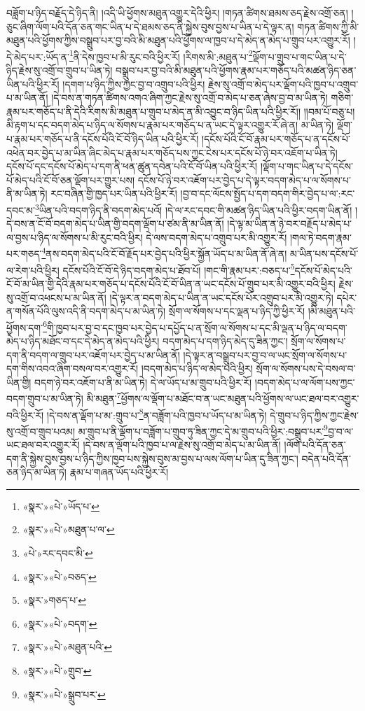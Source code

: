 བཟློག་པ་ཉིད་བརྗོད་དེ་ཉིད་ནི། །འདི་ཡི་ཕྱོགས་མཐུན་འགྱུར་དེའི་ཕྱིར། །གཏན་ཚིགས་ཐམས་ཅད་རྗེས་འགྲོ་ཅན། །ཅུང་ཞིག་ལོག་པའི་དོན་ཅན་གང་ཡིན་པ་དེ་ཐམས་ཅད་ནི་སྐྱེས་བུས་བྱས་པ་ཡིན་པ་དེ་ལྟར་ན། གཏན་ཚིགས་ཀྱི་མི་མཐུན་པའི་ཕྱོགས་ཀྱིས་བསྒྲུབ་པར་བྱ་བའི་མི་མཐུན་པའི་ཕྱོགས་ལ་ཁྱབ་པ་དེ་མེད་ན་མེད་པ་གྲུབ་པར་འགྱུར་རོ། །དེ་མེད་པར་:ཡོད་ན་\footnote{«སྣར་»«པེ་»ཡོད་པ་}ནི་དེས་ཁྱབ་པ་མི་རུང་བའི་ཕྱིར་རོ། །རིགས་མི་:མཐུན་པ་\footnote{«སྣར་»«པེ་»མཐུན་པ་ལ་}ལྡོག་པ་གྲུབ་པ་གང་ཡིན་པ་དེ་ཉིད་རྗེས་སུ་འགྲོ་བ་གྲུབ་པ་ཡིན་ཏེ། བསྒྲུབ་པར་བྱ་བའི་མི་མཐུན་པའི་ཕྱོགས་རྣམ་པར་གཅོད་པའི་མཚན་ཉིད་ཅན་ཡིན་པའི་ཕྱིར་རོ། །དགག་པ་ཉིད་ཀྱིས་ཀྱང་བྱ་བ་འགྲུབ་པའི་ཕྱིར། རྗེས་སུ་འགྲོ་བ་མེད་པར་ལྡོག་པའི་ཁྱབ་པ་འགྲུབ་པ་མ་ཡིན་ནོ། །དེ་བས་ན་གཏན་ཚིགས་འགའ་ཞིག་ཀྱང་རྗེས་སུ་འགྲོ་བ་མེད་པ་ཅན་ཞེས་བྱ་བ་མ་ཡིན་ཏེ། གཅིག་རྣམ་པར་གཅོད་པ་ནི་དེའི་རིགས་མི་མཐུན་པ་གྲུབ་པ་མེད་ན་མི་འབྱུང་བ་ཉིད་ཡིན་པའི་ཕྱིར་རོ།། །།བམ་པོ་བཅུ་པ། མི་རྟག་པ་དང་བདག་མེད་པ་ཉིད་ལ་སོགས་པ་རྣམ་པར་གཅོད་པ་ན་ཡང་དེ་ལྟར་འགྱུར་རོ་ཞེ་ན། མ་ཡིན་ཏེ། ལྡོག་པ་རྣམ་པར་གཅོད་པ་ནི་དངོས་པོའི་ངོ་བོ་ཉིད་ཡིན་པའི་ཕྱིར་རོ། །དངོས་པོའི་ངོ་བོ་རྣམ་པར་གཅོད་པ་ན་དངོས་པོ་འཕེན་བར་བྱེད་པ་མ་ཡིན་ཞིང་མེད་པ་རྣམ་པར་གཅོད་པས་ཀྱང་ངེས་པར་དངོས་པོ་ཉེ་བར་འཇོག་པ་ཡིན་ཏེ། དངོས་པོ་དང་དངོས་པོ་མེད་པ་དག་ནི་ཕན་ཚུན་དབེན་པའི་ངོ་བོ་ཡིན་པའི་ཕྱིར་རོ། །ལྡོག་པ་གང་ཡིན་པ་དེ་དངོས་པོ་མེད་པའི་ངོ་བོ་ཅན་ལྡོག་པར་གྱུར་པས། དངོས་པོ་ཉེ་བར་འཇོག་པར་བྱེད་པ་དེ་ལྟར་བདག་མེད་པ་ལ་སོགས་པ་ནི་མ་ཡིན་ཏེ། རང་བཞིན་གྱི་ཁྱད་པར་ཡིན་པའི་ཕྱིར་རོ། །བྱ་བ་དང་ལོངས་སྤྱོད་པ་དག་བདག་གིར་བྱེད་པ་ལ་:རང་དབང་མ་\footnote{«པེ་»རང་དབང་མི་}ཡིན་པའི་བདག་ཉིད་ནི་བདག་མེད་པའོ། །དེ་ལ་རང་དབང་གི་མཚན་ཉིད་ཡིན་པའི་ཕྱིར་བདག་ཡིན་ནོ། །དེ་བས་ན་ངོ་བོ་བདག་མེད་པ་ཡིན་གྱི་བདག་ལྡོག་པ་ཙམ་ནི་མ་ཡིན་ནོ། །དེ་ལྟ་མ་ཡིན་ན་ཉེ་བར་བརྗོད་པ་མེད་པ་ལ་བྱས་པ་ཉིད་ལ་སོགས་པ་མི་རུང་བའི་ཕྱིར། དེ་ལས་བདག་མེད་པ་འགྲུབ་པར་མི་འགྱུར་རོ། །གལ་ཏེ་བདག་རྣམ་པར་གཅད་\footnote{«སྣར་»«པེ་»བཅད་}ནས་བདག་མེད་པའི་ངོ་བོ་རྗོད་པར་བྱེད་པའི་ཕྱིར་སྐྱོན་ཡོད་པ་མ་ཡིན་ནོ་ཞེ་ན། མ་ཡིན་པས་དངོས་པོ་ལ་རེག་པའི་ཕྱིར། དངོས་པོའི་ངོ་བོ་དེ་ཉིད་བདག་མེད་པ་ཐོབ་པོ། །གང་གི་རྣམ་པར་:བཅད་པ་\footnote{«སྣར་»གཅད་པ་}དངོས་པོ་མེད་པའི་ངོ་བོ་མ་ཡིན་གྱི་དེའི་རྣམ་པར་གཅོད་པ་དངོས་པོའི་ངོ་བོ་ཡིན་ན་ཡང་དངོས་པོ་གྲུབ་པར་མི་འགྱུར་བའི་ཕྱིར། རྗེས་སུ་འགྲོ་བ་འཕངས་པ་མ་ཡིན་ནོ། །དེ་ལྟར་ན་བདག་མེད་པ་ཡིན་ན་ཡང་དངོས་པོར་འགྲུབ་པར་མི་འགྱུར་ཏེ། དཔེར་ན་གསོན་པོའི་ལུས་འདི་ནི་བདག་མེད་པ་མ་ཡིན་ཏེ། སྲོག་ལ་སོགས་པ་དང་ལྡན་པ་ཉིད་ཀྱི་ཕྱིར་རོ། །མི་མཐུན་པའི་ཕྱོགས་དག་\footnote{«སྣར་»«པེ་»བདག་}གི་ཁྱབ་པར་བྱ་བ་དང་ཁྱབ་པར་བྱེད་པ་དཔྱོད་པ་ན་སྲོག་ལ་སོགས་པ་དང་མི་ལྡན་པ་ཉིད་ལ་བདག་མེད་པ་ཉིད་མཐོང་བ་དང་དེ་མེད་ན་མེད་པའི་ཕྱིར། བདག་མེད་པ་དག་ཉིད་མེད་དུ་ཟིན་ཀྱང་། སྲོག་ལ་སོགས་པ་དག་ནི་བདག་ལ་གྲུབ་པར་འཇོག་པར་བྱེད་པ་མ་ཡིན་ནོ། །དེ་ལྟར་ན་བསྒྲུབ་པར་བྱ་བ་ལ་ཡང་སྲོག་ལ་སོགས་པ་དག་གིས་འབའ་ཞིག་བསལ་བར་འགྱུར་རོ། །བདག་མེད་པ་ཉིད་ལ་མེད་པའི་ཕྱིར། སྲོག་ལ་སོགས་པས་དེ་བསལ་བ་ཡིན་གྱི། བདག་ཉེ་བར་འཇོག་པ་ནི་མ་ཡིན་ཏེ། དེ་ལ་ཡོད་པ་མ་གྲུབ་པའི་ཕྱིར་རོ། །བདག་མེད་པ་ལ་ལོག་པས་ཀྱང་བདག་གྲུབ་པ་མ་ཡིན་ཏེ། མི་མཐུན་\footnote{«སྣར་»«པེ་»མཐུན་པའི་}ཕྱོགས་ལ་ལྡོག་པ་མཐོང་བ་ན་ཡང་མཐུན་པའི་ཕྱོགས་ལ་ཡང་ཐལ་བར་འགྱུར་བའི་ཕྱིར་རོ། །དེ་བས་ན་ལྡོག་པ་མ་:གྲུབ་པ་\footnote{«སྣར་»«པེ་»གྲུབ་}ན་བཟློག་པའི་ཁྱབ་པ་ཡོད་པ་མ་ཡིན་ཏེ། དེ་གྲུབ་པ་ཉིད་ཀྱིས་ཀྱང་རྗེས་སུ་འགྲོ་བ་གྲུབ་པའམ། མ་གྲུབ་པ་ནི་ལྡོག་པ་བཟློག་པ་གྲུབ་ཏུ་ཟིན་ཀྱང་དེ་མ་གྲུབ་པའི་ཕྱིར་:བསྒྲུབ་པར་\footnote{«སྣར་»«པེ་»སྒྲུབ་པར་}བྱ་བ་ལ་ཡང་ཐལ་བར་འགྱུར་རོ། །དེ་བས་ན་ལྡོག་པའི་ཁྱབ་པ་ལ་རྗེས་སུ་འགྲོ་བ་མེད་པ་མ་ཡིན་ནོ། །ལོག་པའི་དོན་ཅན་དག་ནི་སྐྱེས་བུས་བྱས་པ་ཉིད་ཀྱིས་ཁྱབ་པས་སྐྱེས་བུས་མ་བྱས་པ་ལས་ལོག་པ་ཡིན་དུ་ཟིན་ཀྱང་། བདེན་པའི་དོན་ཅན་ཉིད་མ་ཡིན་ཏེ། རྣམ་པ་གཞན་ཡོད་པའི་ཕྱིར་རོ། 